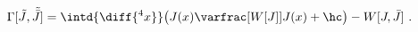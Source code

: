 \begin{equation}
  \label{eq:effactdef}
    \Gamma[\tilde{J},\Tilde{\Bar{J}}] = \intd{\diff{^4x}} \bigl( J(x) \varfrac[W{[}J{]}]{J(x)} +
  \hc \bigr) - W[J,\bar{J}]\ .
\end{equation}

